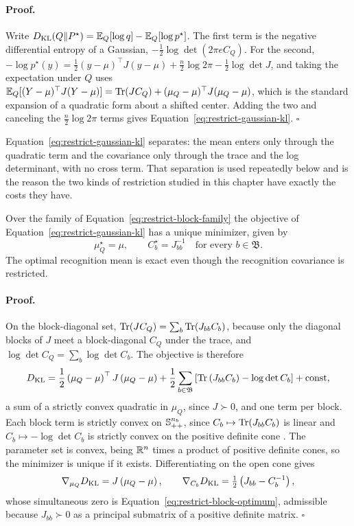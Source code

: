 \paragraph{Proof.}
Write $D_{\mathrm{KL}}(Q\Vert P^\star)=\mathbb E_Q[\log q]-\mathbb E_Q[\log p^\star]$. The first term is the negative differential entropy of a Gaussian, $-\tfrac12\log\det(2\pi eC_Q)$. For the second, $-\log p^\star(y)=\tfrac12(y-\mu)^\top J(y-\mu)+\tfrac n2\log2\pi-\tfrac12\log\det J$, and taking the expectation under $Q$ uses $\mathbb E_Q[(Y-\mu)^\top J(Y-\mu)]=\operatorname{Tr}(JC_Q)+(\mu_Q-\mu)^\top J(\mu_Q-\mu)$, which is the standard expansion of a quadratic form about a shifted center. Adding the two and canceling the $\tfrac n2\log2\pi$ terms gives Equation~\eqref{eq:restrict-gaussian-kl}. $\square$

Equation~\eqref{eq:restrict-gaussian-kl} separates: the mean enters only through the quadratic term and the covariance only through the trace and the log determinant, with no cross term. That separation is used repeatedly below and is the reason the two kinds of restriction studied in this chapter have exactly the costs they have.

Over the family of Equation~\eqref{eq:restrict-block-family} the objective of Equation~\eqref{eq:restrict-gaussian-kl} has a unique minimizer, given by
\begin{equation}
\mu_Q^\star=\mu,
\qquad
C_b^\star=J_{bb}^{-1}
\quad\text{for every }b\in\mathfrak B.
\label{eq:restrict-block-optimum}
\end{equation}
The optimal recognition mean is exact even though the recognition covariance is restricted. 

\paragraph{Proof.}
On the block-diagonal set, $\operatorname{Tr}(JC_Q)=\sum_b\operatorname{Tr}(J_{bb}C_b)$, because only the diagonal blocks of $J$ meet a block-diagonal $C_Q$ under the trace, and $\log\det C_Q=\sum_b\log\det C_b$. The objective is therefore
\begin{equation}
D_{\mathrm{KL}}=\frac12\left(\mu_Q-\mu\right)^\top J\left(\mu_Q-\mu\right)
+\frac12\sum_{b\in\mathfrak B}\left[\operatorname{Tr}\left(J_{bb}C_b\right)-\log\det C_b\right]
+\text{const},
\label{eq:restrict-separated-objective}
\end{equation}
a sum of a strictly convex quadratic in $\mu_Q$, since $J\succ0$, and one term per block. Each block term is strictly convex on $\mathbb S_{++}^{n_b}$, since $C_b\mapsto\operatorname{Tr}(J_{bb}C_b)$ is linear and $C_b\mapsto-\log\det C_b$ is strictly convex on the positive definite cone \citep[\S3.1.5]{Boyd2004}. The parameter set is convex, being $\mathbb R^{n}$ times a product of positive definite cones, so the minimizer is unique if it exists. Differentiating on the open cone gives
\begin{equation}
\nabla_{\mu_Q}D_{\mathrm{KL}}=J\left(\mu_Q-\mu\right),
\qquad
\nabla_{C_b}D_{\mathrm{KL}}=\tfrac12\left(J_{bb}-C_b^{-1}\right),
\label{eq:restrict-derivatives}
\end{equation}
whose simultaneous zero is Equation~\eqref{eq:restrict-block-optimum}, admissible because $J_{bb}\succ0$ as a principal submatrix of a positive definite matrix. $\square$

